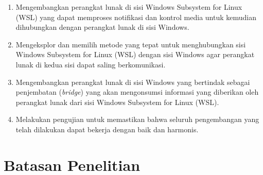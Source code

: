\begin{enumerate}
    \item Mengembangkan perangkat lunak di sisi Windows Subsystem for Linux (WSL) yang dapat memproses notifikasi dan kontrol media untuk kemudian dihubungkan dengan perangkat lunak di sisi Windows.

    \item Mengeksplor dan memilih metode yang tepat untuk menghubungkan sisi Windows Subsystem for Linux (WSL) dengan sisi Windows agar perangkat lunak di kedua sisi dapat saling berkomunikasi.

    \item Mengembangkan perangkat lunak di sisi Windows yang bertindak sebagai penjembatan (\textit{bridge}) yang akan mengonsumsi informasi yang diberikan oleh perangkat lunak dari sisi Windows Subsystem for Linux (WSL).

    \item Melakukan pengujian untuk memastikan bahwa seluruh pengembangan yang telah dilakukan dapat bekerja dengan baik dan harmonis.

\end{enumerate}


\section{Batasan Penelitian}

